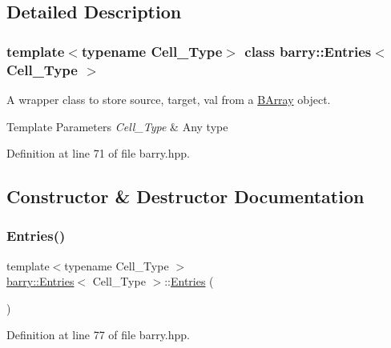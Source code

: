 \subsection{Detailed Description}
\subsubsection*{template$<$typename Cell\+\_\+\+Type$>$\newline
class barry\+::\+Entries$<$ Cell\+\_\+\+Type $>$}

A wrapper class to store {\ttfamily source}, {\ttfamily target}, {\ttfamily val} from a {\ttfamily \hyperlink{classbarry_1_1_b_array}{B\+Array}} object. 


\begin{DoxyTemplParams}{Template Parameters}
{\em Cell\+\_\+\+Type} & Any type \\
\hline
\end{DoxyTemplParams}


Definition at line 71 of file barry.\+hpp.



\subsection{Constructor \& Destructor Documentation}
\mbox{\label{classbarry_1_1_entries_aa51d37ad8e5f441fd64c954dfab9ad04}} 
\subsubsection{\texorpdfstring{Entries()}{Entries()}\hspace{0.1cm}{\footnotesize\ttfamily [1/2]}}
{\footnotesize\ttfamily template$<$typename Cell\+\_\+\+Type $>$ \\
\hyperlink{classbarry_1_1_entries}{barry\+::\+Entries}$<$ Cell\+\_\+\+Type $>$\+::\hyperlink{classbarry_1_1_entries}{Entries} (\begin{DoxyParamCaption}{ }\end{DoxyParamCaption})\hspace{0.3cm}{\ttfamily [inline]}}



Definition at line 77 of file barry.\+hpp.

\mbox{\label{classbarry_1_1_entries_a22dda1d0afd4fbe4b658e55ca1b61f16}} 
